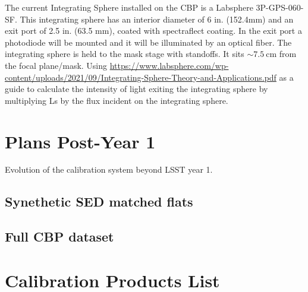 \documentclass[SE,authoryear,lsstdraft,toc]{lsstdoc}
\begin{document}
The current Integrating Sphere installed on the CBP is a Labsphere 3P-GPS-060-SF.
This integrating sphere has an interior diameter of 6 in. (152.4mm) and an exit port of 2.5 in. (63.5 mm), coated with spectraflect coating.
In the exit port a photodiode will be mounted and it will be illuminated by an optical fiber.
The integrating sphere is held to the mask stage with standoffs.
It sits $\sim 7.5~\mathrm{cm}$ from the focal plane/mask.
Using \url{https://www.labsphere.com/wp-content/uploads/2021/09/Integrating-Sphere-Theory-and-Applications.pdf} as a guide to calculate the intensity of light exiting the integrating sphere by multiplying Ls by the flux incident on the integrating sphere.


\section{Plans Post-Year 1}

Evolution of the calibration system beyond LSST year 1.

\subsection{Synethetic SED matched flats}

\subsection{Full CBP dataset}


\appendix
\section{Calibration Products List}
\end{document}
